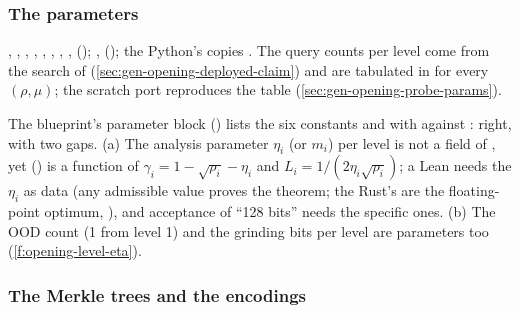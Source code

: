 \subsubsection{The parameters}\label{sec:gen-opening-parameters}

\begin{sloppypar}
, , ,
, ,
, ,
, 
(); ,  (); the
Python's copies . The query counts per level come from the search of
 (\cref{sec:gen-opening-deployed-claim}) and are tabulated in
 for every $(ρ, μ)$; the scratch port reproduces the table
(\cref{sec:gen-opening-probe-params}).

The blueprint's parameter block () lists the six constants and
 with  against
: right, with two gaps. (a) The analysis parameter $η_i$ (or $m_i$) per level is not a
field of , yet  () is a function of
$γ_i = 1 − \sqrt{ρ_i} − η_i$ and $L_i = 1/(2η_i\sqrt{ρ_i})$; a Lean  needs the $η_i$
as data (any admissible value proves the theorem; the Rust's are the floating-point optimum,
), and acceptance of ``128 bits'' needs the specific ones. (b) The OOD
count (1 from level 1) and the grinding bits per level are parameters too
(\cref{f:opening-level-eta}).
\end{sloppypar}

\subsubsection{The Merkle trees and the encodings}\label{sec:gen-opening-merkle}

